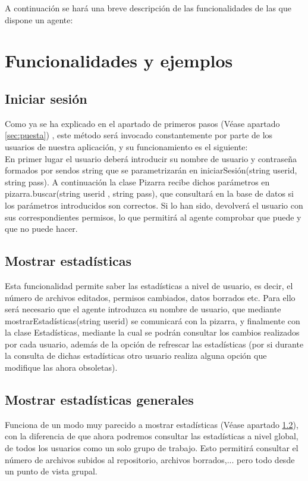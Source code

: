 A continuación se hará una breve descripción de las funcionalidades de las que dispone un agente:
\section{Funcionalidades y ejemplos}
\subsection{Iniciar sesión}
Como ya se ha explicado en el apartado de primeros pasos (Véase apartado \ref{sec:puesta}) , este método será invocado constantemente por parte de los usuarios de nuestra aplicación, y su funcionamiento es el siguiente:\\
En primer lugar el usuario deberá introducir su nombre de usuario y contraseña formados por sendos string que se parametrizarán en iniciarSesión(string userid, string pass). A continuación la clase Pizarra recibe dichos parámetros en pizarra.buscar(string userid , string pass), que consultará en la base de datos si los parámetros introducidos son correctos. Si lo han sido, devolverá el usuario con sus correspondientes permisos, lo que permitirá al agente comprobar que puede y que no puede hacer.

\subsection{Mostrar estadísticas}\label{sec:est}
Esta funcionalidad permite saber las estadísticas a nivel de usuario, es decir, el número de archivos editados, permisos cambiados, datos borrados etc. Para ello será necesario que el agente introduzca su nombre de usuario, que mediante mostrarEstadísticas(string userid) se comunicará con la pizarra, y finalmente con la clase Estadísticas, mediante la cual se podrán consultar los cambios realizados por cada usuario, además de la opción de refrescar las estadísticas (por si durante la consulta de dichas estadísticas otro usuario realiza alguna opción que modifique las ahora obsoletas).
\subsection{Mostrar estadísticas generales}
Funciona de un modo muy parecido a mostrar estadísticas (Véase apartado \ref{sec:est}), con la diferencia de que ahora podremos consultar las estadísticas a nivel global, de todos los usuarios como un solo grupo de trabajo. Esto permitirá consultar el número de archivos subidos al repositorio, archivos borrados,... pero todo desde un punto de vista grupal.
